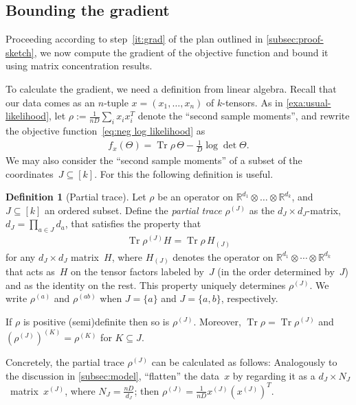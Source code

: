 \documentclass[aos]{imsart}
\theoremstyle{definition}
\newtheorem{definition}[theorem]{Definition}
\numberwithin{equation}{section}
\DeclareMathOperator{\tr}{Tr}
\newcommand{\R}{{\mathbb{R}}}
\newcommand{\ot}{\otimes}
\begin{document}
\subsection{Bounding the gradient}
Proceeding according to step~\ref{it:grad} of the plan outlined in \cref{subsec:proof-sketch}, we now compute the gradient of the objective function and bound it using matrix concentration results.

To calculate the gradient, we need a definition from linear algebra.
Recall that our data comes as an $n$-tuple $x=(x_1,\dots,x_n)$ of $k$-tensors. %
As in \cref{exa:usual-likelihood}, let $\rho := \frac1{nD}\sum_i x_i x_i^T$ denote the ``second sample moments'', and rewrite the objective function~\eqref{eq:neg log likelihood} as
\begin{align}\label{eq:obj via rho}
  f_x(\Theta) = \tr \rho \, \Theta - \frac1D \log \det \Theta.
\end{align}
We may also consider the ``second sample moments'' of a subset of the coordinates~$J \subseteq [k]$.
For this the following definition is useful.

\begin{definition}[Partial trace]\label{definition:partial-trace}
Let $\rho$ be an operator on $\R^{d_1} \ot \dots \ot \R^{d_k}$, and~$J \subseteq [k]$ an ordered subset.
Define the \emph{partial trace} $\rho^{(J)}$ as the $d_J \times d_J$-matrix, $d_J = \prod_{a\in J} d_a$, that satisfies the property that
\begin{align}\label{eq:partial trace duality}
  \tr \rho^{(J)} H
= \tr \rho \, H_{(J)}
\end{align}
for any $d_J\times d_J$ matrix~$H$, where $H_{(J)}$ denotes the operator on $\R^{d_1} \ot \cdots \ot \R^{d_k}$ that acts as~$H$ on the tensor factors labeled by~$J$ (in the order determined by~$J$) and as the identity on the rest.
This property uniquely determines $\rho^{(J)}$.
We write $\rho^{(a)}$ and $\rho^{(ab)}$ when $J=\{a\}$ and $J=\{a,b\}$, respectively.
\end{definition}

If $\rho$ is positive (semi)definite then so is $\rho^{(J)}$.
Moreover, $\tr \rho = \tr \rho^{(J)}$ and $(\rho^{(J)})^{(K)} = \rho^{(K)}$ for $K \subseteq J$.

Concretely, the partial trace $\rho^{(J)}$ can be calculated as follows:
Analogously to the discussion in \cref{subsec:model}, ``flatten'' the data~$x$ by regarding it as a $d_J \times N_J$~matrix~$x^{(J)}$, where $N_J = \frac{nD}{d_J}$;
then $\rho^{(J)} = \frac1{nD} x^{(J)} (x^{(J)})^T$.
\end{document}
